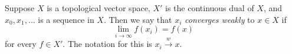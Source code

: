 \documentclass[12pt]{article}
\begin{document}
Suppose $X$ is a topological vector space, $X'$ is the continuous dual 
of $X$, and $x_0,x_1,\ldots $ is a sequence in $X$. 
Then we say that $x_i$ \emph{converges weakly} to $x\in X$ if 
$$
   \lim_{i\to \infty} f(x_i) = f(x)
$$
for every $f\in X'$. The notation for this is 
$x_i \xrightarrow[]{w} x$.
\end{document}

